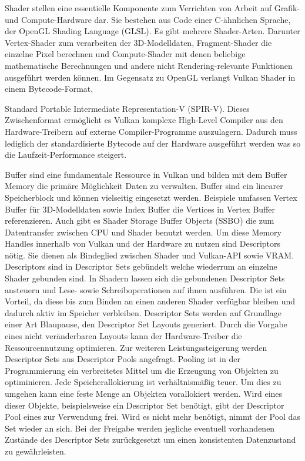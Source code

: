 \documentclass[11pt]{scrartcl}
\begin{document}
	Shader stellen eine essentielle Komponente zum Verrichten von Arbeit auf Grafik- und Compute-Hardware dar. Sie bestehen aus Code einer C-ähnlichen Sprache, der OpenGL Shading Language (GLSL)\cite{Rost2004}. Es gibt mehrere Shader-Arten. Darunter Vertex-Shader zum verarbeiten der 3D-Modelldaten, Fragment-Shader die einzelne Pixel berechnen und Compute-Shader mit denen beliebige mathematische Berechnungen und andere nicht Rendering-relevante Funktionen ausgeführt werden können.\cite{Sellers2017} Im Gegensatz zu OpenGL verlangt Vulkan Shader in einem Bytecode-Format, {Standard Portable Intermediate Representation-V (SPIR-V). Dieses Zwischenformat ermöglicht es Vulkan komplexe High-Level Compiler aus den Hardware-Treibern auf externe Compiler-Programme auszulagern. Dadurch muss lediglich der standardisierte Bytecode auf der Hardware ausgeführt werden was so die Laufzeit-Performance steigert.\cite{VulkanSpirv}

	Buffer sind eine fundamentale Ressource in Vulkan und bilden mit dem Buffer Memory die primäre Möglichkeit Daten zu verwalten. Buffer sind ein linearer Speicherblock und können vielseitig eingesetzt werden. Beispiele umfassen Vertex Buffer für 3D-Modelldaten sowie Index Buffer die Vertices in Vertex Buffer referenzieren. Auch gibt es Shader Storage Buffer Objects (SSBO) die zum Datentransfer zwischen CPU und Shader benutzt werden.\cite{Sellers2017}
	Um diese Memory Handles innerhalb von Vulkan und der Hardware zu nutzen sind Descriptors nötig. Sie dienen als Bindeglied zwischen Shader und Vulkan-API sowie VRAM. Descriptors sind in Descriptor Sets gebündelt welche wiederrum an einzelne Shader gebunden sind. In Shadern lassen sich die gebundenen Descriptor Sets ansteuern und Lese- sowie Schreiboperationen auf ihnen ausführen. Die ist ein Vorteil, da diese bis zum Binden an einen anderen Shader verfügbar bleiben und dadurch aktiv im Speicher verbleiben. Descriptor Sets werden auf Grundlage einer Art Blaupause, den Descriptor Set Layouts generiert. Durch die Vorgabe eines nicht veränderbaren Layouts kann der Hardware-Treiber die Ressourcennutzung optimieren. Zur weiteren Leistungssteigerung werden Descriptor Sets aus Descriptor Pools angefragt. Pooling ist in der Programmierung ein verbreitetes Mittel um die Erzeugung von Objekten zu optiminieren. Jede Speicherallokierung ist verhältnismäßig teuer. Um dies zu umgehen kann eine feste Menge an Objekten vorallokiert werden. Wird eines dieser Objekte, beispielsweise ein Descriptor Set benötigt, gibt der Descriptor Pool eines zur Verwendung frei. Wird es nicht mehr benötigt, nimmt der Pool das Set wieder an sich. Bei der Freigabe werden jegliche eventuell vorhandenen Zustände des Descriptor Sets zurückgesetzt um einen konsistenten Datenzustand zu gewährleisten.\cite{Sellers2017, VulkanDescriptorPools}
	
}
\end{document}
